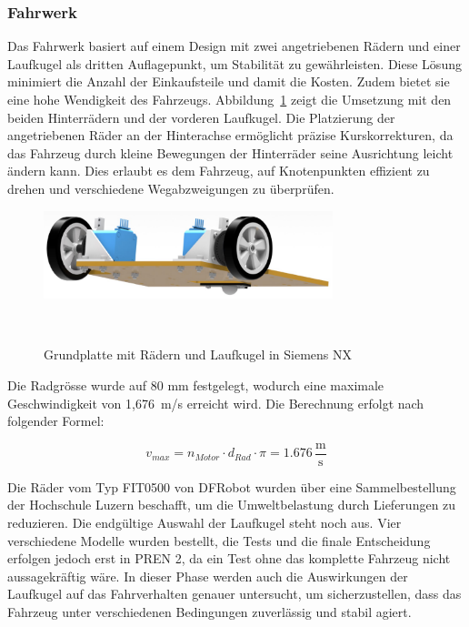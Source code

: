 \documentclass[main.tex]{subfiles} %
\begin{document}
\newpage

\subsubsection*{Fahrwerk}

Das Fahrwerk basiert auf einem Design mit zwei angetriebenen Rädern und einer
Laufkugel als dritten Auflagepunkt, um Stabilität zu gewährleisten. Diese
Lösung minimiert die Anzahl der Einkaufsteile und damit die Kosten. Zudem
bietet sie eine hohe Wendigkeit des Fahrzeugs. Abbildung~\ref{fig:Fahrwerk}
zeigt die Umsetzung mit den beiden Hinterrädern und der vorderen Laufkugel. Die
Platzierung der angetriebenen Räder an der Hinterachse ermöglicht präzise
Kurskorrekturen, da das Fahrzeug durch kleine Bewegungen der Hinterräder seine
Ausrichtung leicht ändern kann. Dies erlaubt es dem Fahrzeug, auf Knotenpunkten
effizient zu drehen und verschiedene Wegabzweigungen zu überprüfen.

\begin{figure}[H]
    \centering
    \includegraphics[width=0.75\textwidth]{Fahrwerk.pdf}
    \caption{Grundplatte mit Rädern und Laufkugel in Siemens NX}~\label{fig:Fahrwerk}
\end{figure}

Die Radgrösse wurde auf 80 mm festgelegt, wodurch eine maximale Geschwindigkeit
von 1,676~m/s erreicht wird. Die Berechnung erfolgt nach folgender Formel:

\[ v_{max} = n_{Motor} \cdot d_{Rad} \cdot \pi = 1.676 \, \frac{\text{m}}{\text{s}} \]

Die Räder vom Typ FIT0500 von DFRobot wurden über eine Sammelbestellung der
Hochschule Luzern beschafft, um die Umweltbelastung durch Lieferungen zu
reduzieren. Die endgültige Auswahl der Laufkugel steht noch aus. Vier
verschiedene Modelle wurden bestellt, die Tests und die finale Entscheidung
erfolgen jedoch erst in PREN 2, da ein Test ohne das komplette Fahrzeug nicht
aussagekräftig wäre. In dieser Phase werden auch die Auswirkungen der Laufkugel
auf das Fahrverhalten genauer untersucht, um sicherzustellen, dass das Fahrzeug
unter verschiedenen Bedingungen zuverlässig und stabil agiert.
\end{document}
